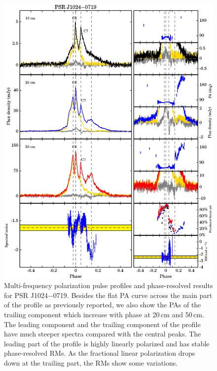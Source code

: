 \documentclass[useAMS,usenatbib]{mn2e}
\begin{document}
\begin{appendix}
\begin{figure}
\begin{center}
\includegraphics[width=6 in]{1024.ps}
\caption{Multi-frequency polarization pulse profiles and phase-resolved results for PSR J1024$-$0719. 
Besides the flat PA curve across the main part of the profile as 
previously reported, we also show the PAs of the trailing component which 
increase with phase at 20\,cm and 50\,cm.
%
The leading component and the trailing component of the profile have much 
steeper spectra compared with the central peaks. 
%
The leading part of the profile is highly linearly polarized and has stable  
phase-resolved RMs. As the fractional linear polarization drops down at the 
trailing part, the RMs show some variations.
}
\label{1024}
\end{center}
\end{figure}


\end{appendix}
\end{document}
